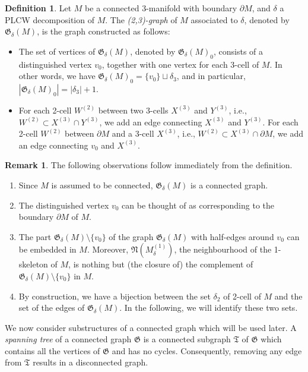 \documentclass[11pt]{amsart}
\theoremstyle{definition}
\newtheorem{definition}[thm]{Definition}
\newtheorem{remark}[thm]{Remark}
\numberwithin{equation}{section}
\def\bd{{\partial}}
\def\nb{\mathfrak{N}}
\newcommand{\threeCell}[1]{{#1}^{(3)}}
\newcommand{\twoCell}[1]{{#1}^{(2)}}
\newcommand{\ourGraph}{\fG}
\def\de{\delta}
\def\fG{\mathfrak{G}}
\def\fT{{\mathfrak{T}}}
\begin{document}
\begin{definition}\label{def:23-graph}
Let $M$ be a connected 3-manifold with boundary $\bd M$, and $\de$ a PLCW decomposition of $M$. 
The \emph{(2,3)-graph} of $M$ associated to $\de$, denoted by $\ourGraph_{\de}(M)$, is the graph constructed as follows:
\begin{itemize}
\item 
The set of vertices of $\ourGraph_{\de}(M)$, denoted by $\ourGraph_{\de}(M)_0$, consists of a distinguished vertex $v_0$, together with one vertex for each 3-cell of $M$. 
In other words, we have 
$\ourGraph_{\de}(M)_0 =\{v_0\} \sqcup \delta_3$, 
and in particular, $|\ourGraph_{\de}(M)_0| = |\de_3|+1$.

\item 
For each 2-cell $\twoCell{W}$ between two 3-cells $\threeCell{X}$ and $\threeCell{Y}$, i.e., $\twoCell{W} \subset \threeCell{X}\cap\threeCell{Y}$, we add an edge connecting $\threeCell{X}$ and $\threeCell{Y}$. For each 2-cell $\twoCell{W}$ between $\bd M$ and a 3-cell $\threeCell{X}$, i.e., $\twoCell{W} \subset \threeCell{X} \cap \bd M$, we add an edge connecting $v_0$ and $\threeCell{X}$. 
\end{itemize}
\end{definition}

\begin{remark}\label{rmk:our-graph}
The following observations follow immediately from the definition.
\begin{enumerate}
\item Since $M$ is assumed to be connected, $\ourGraph_{\de}(M)$ is a connected graph.
\item The distinguished vertex $v_0$ can be thought of as corresponding to the boundary $\bd M$ of $M$.
\item The part $\ourGraph_{\de}(M) \setminus \{v_0\}$ of the graph $\ourGraph_{\de}(M)$ with half-edges around $v_0$ can be embedded in $M$. Moreover, $\nb(M_\delta^{(1)})$, the neighbourhood of the 1-skeleton of $M$, is nothing but (the closure of) the complement of $\ourGraph_{\de}(M) \setminus \{v_0\}$ in $M$. 
\item  By construction, we have a bijection between the set $\de_2$ of 2-cell of $M$ and the set of the edges of $\ourGraph_{\de}(M)$. In the following, we will identify these two sets. 
\end{enumerate}
\end{remark}

We now consider substructures of a connected graph which will be used later.
A \textit{spanning tree} of a connected graph $\fG$ is a connected subgraph $\fT$ of $\fG$ which contains all the vertices of $\fG$ and has no cycles. 
Consequently, removing any edge from $\fT$ results in a disconnected graph.
\end{document}
